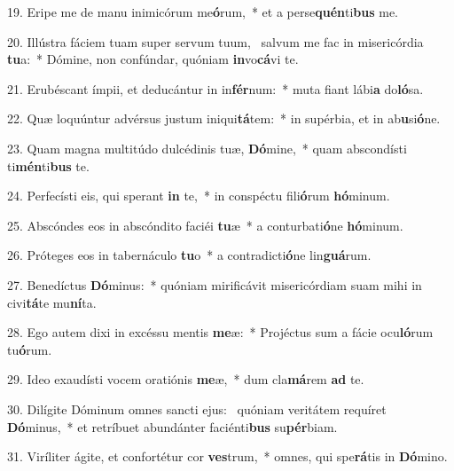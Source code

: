 19. Eripe me de manu inimicórum me\textbf{ó}rum,~*  et a perse\textbf{quén}ti\textbf{bus} me.\

20. Illústra fáciem tuam super servum tuum, \dag\  salvum me fac in misericórdia \textbf{tu}a:~*  Dómine, non confúndar, quóniam \textbf{in}vo\textbf{cá}vi te.\

21. Erubéscant ímpii, et deducántur in in\textbf{fér}num:~*  muta fiant lábi\textbf{a} do\textbf{ló}sa.\

22. Quæ loquúntur advérsus justum iniqui\textbf{tá}tem:~*  in supérbia, et in ab\textbf{u}si\textbf{ó}ne.\

23. Quam magna multitúdo dulcédinis tuæ, \textbf{Dó}mine,~*  quam abscondísti ti\textbf{mén}ti\textbf{bus} te.\

24. Perfecísti eis, qui sperant \textbf{in} te,~*  in conspéctu fili\textbf{ó}rum \textbf{hó}minum.\

25. Abscóndes eos in abscóndito faciéi \textbf{tu}æ~*  a conturbati\textbf{ó}ne \textbf{hó}minum.\

26. Próteges eos in tabernáculo \textbf{tu}o~*  a contradicti\textbf{ó}ne lin\textbf{guá}rum.\

27. Benedíctus \textbf{Dó}minus:~*  quóniam mirificávit misericórdiam suam mihi in civi\textbf{tá}te mu\textbf{ní}ta.\

28. Ego autem dixi in excéssu mentis \textbf{me}æ:~*  Projéctus sum a fácie ocu\textbf{ló}rum tu\textbf{ó}rum.\

29. Ideo exaudísti vocem oratiónis \textbf{me}æ,~*  dum cla\textbf{má}rem \textbf{ad} te.\

30. Dilígite Dóminum omnes sancti ejus: \dag\  quóniam veritátem requíret \textbf{Dó}minus,~*  et retríbuet abundánter faciénti\textbf{bus} su\textbf{pér}biam.\

31. Viríliter ágite, et confortétur cor \textbf{ves}trum,~*  omnes, qui spe\textbf{rá}tis in \textbf{Dó}mino.\

